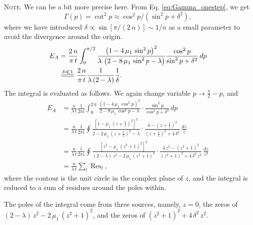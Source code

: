 \documentclass[preprint, floatfix]{revtex4-1}
\newcommand{\note}[1]{{\color{DarkGreen}\footnotesize \textsc{Note.} #1}}
\newcommand{\Err}{E}
\begin{document}
\note{We can be a bit more precise here.
%
From Eq. \eqref{eq:Gamma_onestep}, we get
%
$$
\Gamma(p) = \cot^2 p \approx \cos^2 p / (\sin^2 p + \delta^2),
$$
%
where we have introduced
$\delta \propto \sin[ \pi / (2 \, n) ] \sim 1/n$
as a small parameter to avoid the divergence
around the origin.
%
$$
\begin{aligned}
\Err_A
&=
\frac{   2 \, n }
     { \pi \, t }
\int_0^{\pi/2}
    \frac{            \left(1 - 4 \, \mu_1 \, \sin^2 p \right)^2         }
         { \lambda \, \left(2 - 8 \, \mu_1 \, \sin^2 p - \lambda \right) }
    \frac{ \cos^2 p }
         { \sin^2 p + \delta^2 }
\, dp
\notag \\
&
\stackrel{    \delta \ll 1     }
         { =\joinrel=\joinrel= }
\frac{   2 \, n }
     { \pi \, t }
\frac{             1             }
     {  \lambda \, (2 - \lambda) }
\frac{    1   }
     { \delta }
.
\end{aligned}
$$
The integral is evaluated as follows.
%
We again change variable $p \to \frac{ \pi } { 2 } - p$,
and
$$
\begin{aligned}
\Err_A
&=
\frac{n}{\lambda \, t}
\frac{1}{2 \pi i}
\int_0^{2 \, \pi}
\frac{ \left(1 - 4 \, \mu_1 \, \cos^2 p \right)^2 }
     {       2 - 8 \, \mu_1 \, \cos^2 p - \lambda }
\cdot
\frac{ \sin^2 p            }
     { \cos^2 p + \delta^2 }
\, dp
\\
&=
\frac{n}{\lambda \, t}
\frac{1}{2 \pi i}
\oint
\frac{ \left[1 -      \mu_1 \, \left(z + \frac{1}{z}\right)^2 \right]^2 }
     {       2 - 2 \, \mu_1 \, \left(z + \frac{1}{z}\right)^2 - \lambda }
\cdot
\frac{ 4 - \left( z + \frac 1 z \right)^2 }
     { \left( z + \frac 1 z \right)^2 + 4 \, \delta^2 }
\, \frac{dz}{z}
\\
&=
\frac{n}{\lambda \, t}
\frac{1}{2 \pi i}
\oint
\frac{ \left[z^2 -      \mu_1 \, (z^2 + 1)^2 \right]^2   }
     {  (2 - \lambda) \, z^2 - 2 \, \mu_1 \, (z^2 + 1)^2 }
\cdot
\frac{ 4 \, z^2 - ( z^2 + 1 )^2 }
     { ( z^2 + 1 )^2 + 4 \, \delta^2 \, z^2 }
\, \frac{ dz }{ z^3 }
\\
&=
\frac{ n } { \lambda \, t }
\sum_l \operatorname{Res}_l
,
\end{aligned}
$$
where the contour is the unit circle
in the complex plane of $z$,
and the integral is reduced to a sum of residues
around the poles within.

The poles of the integral come from three sources,
namely,
$z = 0$,
the zeros of
$(2 - \lambda) \, z^2 - 2 \, \mu_1 \, (z^2 + 1)^2$,
and the zeros of
$( z^2 + 1 )^2 + 4 \, \delta^2 \, z^2$.

}
\end{document}
